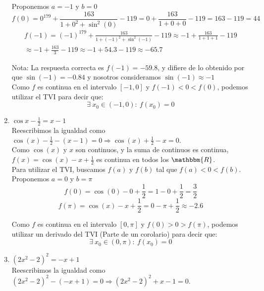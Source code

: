 \documentclass[12pt]{article}
\begin{document}
\begin{enumerate}[\hspace{9px} a)]
        Proponemos $a=-1$ y $b=0$
        \[f(0)=0^{179}+\displaystyle\frac{163}{1+0^2+\sin^2(0)}-119 = 0+\displaystyle\frac{163}{1+0+0}-119 = 163-119 = 44\]
        \begin{multline*}
            f(-1)=(-1)^{179}+\displaystyle\frac{163}{1+(-1)^2+\sin^2(-1)}-119 \approx -1+\displaystyle\frac{163}{1+1+1}-119 \\ \approx -1+\displaystyle\frac{163}{3}-119 \approx -1+54.3-119 \approx -65.7
        \end{multline*}

        Nota: La respuesta correcta es $f(-1)=-59.8$, y difiere de lo obtenido por que $\sin(-1)=-0.84$ y nosotros consideramos $\sin(-1) \approx -1$\\

        Como $f$ es continua en el intervalo $[-1,0]$ y \(f(-1)<0<f(0)\), podemos utilizar el TVI para decir que: \[\exists \ x_0 \in (-1,0) : \ f(x_0)=0\]

    \item \(\cos x - \displaystyle\frac{1}{2}=x-1\)\\

        Reescribimos la igualdad como \(\cos(x)-\displaystyle\frac{1}{2}-(x-1)=0 \Longrightarrow \cos(x)+\displaystyle\frac{1}{2}-x=0\).\\

        Como $\cos(x)$ y $x$ son continuos, y la suma de continuos es continua, $f(x)=\cos(x)-x+\displaystyle\frac{1}{2}$ es continua en todos los $\mathbbm{R}$.\\

        Para utilizar el TVI, buscamos $f(a)$ y $f(b)$ tal que $f(a)<0<f(b)$.\\

        Proponemos $a=0$ y $b=\pi$
        \[f(0)=\cos(0)-0+\frac{1}{2} = 1-0+\frac{1}{2} = \frac{3}{2}\]
        \[f(\pi)=\cos(x)-x+\frac{1}{2} = 0-\pi+\frac{1}{2} \approx -2.6\]

        Como $f$ es continua en el intervalo $[0,\pi]$ y \(f(0)>0>f(\pi)\), podemos utilizar un derivado del TVI (Parte de un corolario) para decir que: \[\exists \ x_0 \in (0,\pi) : \ f(x_0)=0\]

    \item \((2x^2-2)^2=-x+1\)\\

    Reescribimos la igualdad como \((2x^2-2)^2-(-x+1)=0 \Longrightarrow (2x^2-2)^2+x-1=0\).\\


\end{enumerate}
\end{document}
